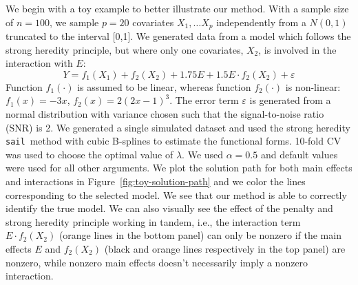 \documentclass[12pt,letter]{article}\usepackage[]{graphicx}\usepackage[]{color}
\newcommand{\sail}{\texttt{sail}}
\begin{document}
We begin with a toy example to better illustrate our method. With a sample size of $n=100$, we sample $p=20$ covariates $X_1, \ldots X_p$ independently from a $N(0,1)$ truncated to the interval [0,1]. We generated data from a model which follows the strong heredity principle, but where only one covariates, $X_2$, is involved in the interaction with $E$:
\begin{equation}
	Y = f_1(X_1) + f_2(X_2) + 1.75 E + 1.5 E \cdot f_2(X_2) + \varepsilon
\end{equation}
Function $f_1(\cdot)$ is assumed to be linear, whereas function $f_2(\cdot)$ is non-linear: $f_1(x) = -3x$, $f_2(x) = 2(2x-1)^3$. The error term $\varepsilon$ is generated from a normal distribution with variance chosen such that the signal-to-noise ratio (SNR) is 2.  We generated a single simulated dataset and used the strong heredity \sail ~method with cubic B-splines to estimate the functional forms. 10-fold CV was used to choose the optimal value of $\lambda$. We used $\alpha=0.5$ and default values were used for all other arguments. We plot the solution path for both main effects and interactions in Figure~\ref{fig:toy-solution-path} and we color the lines corresponding to the selected model. We see that our method is able to correctly identify the true model. We can also visually see the effect of the penalty and strong heredity principle working in tandem, i.e., the interaction term $E \cdot f_2(X_2)$ (orange lines in the bottom panel) can only be nonzero if the main effects $E$ and $f_2(X_2)$ (black and orange lines respectively in the top panel) are nonzero, while nonzero main effects doesn't necessarily imply a nonzero interaction. 
\end{document}
